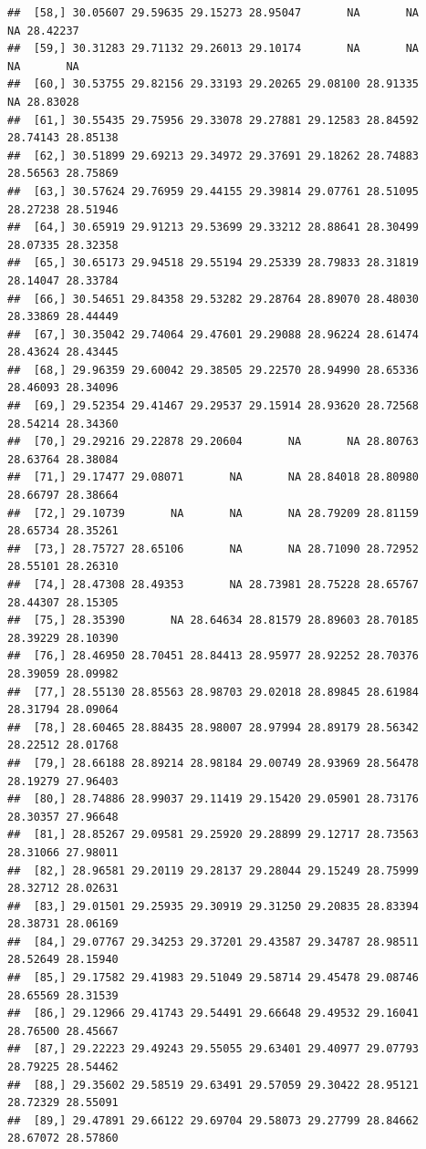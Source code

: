 \documentclass{article}\usepackage[]{graphicx}\usepackage[]{color}
\makeatletter
\newenvironment{kframe}{%
 \def\at@end@of@kframe{}%
 \ifinner\ifhmode%
  \def\at@end@of@kframe{\end{minipage}}%
  \begin{minipage}{\columnwidth}%
 \fi\fi%
 \def\FrameCommand##1{\hskip\@totalleftmargin \hskip-\fboxsep
 \colorbox{shadecolor}{##1}\hskip-\fboxsep
     \hskip-\linewidth \hskip-\@totalleftmargin \hskip\columnwidth}%
 \MakeFramed {\advance\hsize-\width
   \@totalleftmargin\z@ \linewidth\hsize
   \@setminipage}}%
 {\par\unskip\endMakeFramed%
 \at@end@of@kframe}
\newenvironment{knitrout}{}{} %
\makeatother
\begin{document}
\begin{knitrout}
\begin{kframe}
\begin{verbatim}
##  [58,] 30.05607 29.59635 29.15273 28.95047       NA       NA       NA 28.42237
##  [59,] 30.31283 29.71132 29.26013 29.10174       NA       NA       NA       NA
##  [60,] 30.53755 29.82156 29.33193 29.20265 29.08100 28.91335       NA 28.83028
##  [61,] 30.55435 29.75956 29.33078 29.27881 29.12583 28.84592 28.74143 28.85138
##  [62,] 30.51899 29.69213 29.34972 29.37691 29.18262 28.74883 28.56563 28.75869
##  [63,] 30.57624 29.76959 29.44155 29.39814 29.07761 28.51095 28.27238 28.51946
##  [64,] 30.65919 29.91213 29.53699 29.33212 28.88641 28.30499 28.07335 28.32358
##  [65,] 30.65173 29.94518 29.55194 29.25339 28.79833 28.31819 28.14047 28.33784
##  [66,] 30.54651 29.84358 29.53282 29.28764 28.89070 28.48030 28.33869 28.44449
##  [67,] 30.35042 29.74064 29.47601 29.29088 28.96224 28.61474 28.43624 28.43445
##  [68,] 29.96359 29.60042 29.38505 29.22570 28.94990 28.65336 28.46093 28.34096
##  [69,] 29.52354 29.41467 29.29537 29.15914 28.93620 28.72568 28.54214 28.34360
##  [70,] 29.29216 29.22878 29.20604       NA       NA 28.80763 28.63764 28.38084
##  [71,] 29.17477 29.08071       NA       NA 28.84018 28.80980 28.66797 28.38664
##  [72,] 29.10739       NA       NA       NA 28.79209 28.81159 28.65734 28.35261
##  [73,] 28.75727 28.65106       NA       NA 28.71090 28.72952 28.55101 28.26310
##  [74,] 28.47308 28.49353       NA 28.73981 28.75228 28.65767 28.44307 28.15305
##  [75,] 28.35390       NA 28.64634 28.81579 28.89603 28.70185 28.39229 28.10390
##  [76,] 28.46950 28.70451 28.84413 28.95977 28.92252 28.70376 28.39059 28.09982
##  [77,] 28.55130 28.85563 28.98703 29.02018 28.89845 28.61984 28.31794 28.09064
##  [78,] 28.60465 28.88435 28.98007 28.97994 28.89179 28.56342 28.22512 28.01768
##  [79,] 28.66188 28.89214 28.98184 29.00749 28.93969 28.56478 28.19279 27.96403
##  [80,] 28.74886 28.99037 29.11419 29.15420 29.05901 28.73176 28.30357 27.96648
##  [81,] 28.85267 29.09581 29.25920 29.28899 29.12717 28.73563 28.31066 27.98011
##  [82,] 28.96581 29.20119 29.28137 29.28044 29.15249 28.75999 28.32712 28.02631
##  [83,] 29.01501 29.25935 29.30919 29.31250 29.20835 28.83394 28.38731 28.06169
##  [84,] 29.07767 29.34253 29.37201 29.43587 29.34787 28.98511 28.52649 28.15940
##  [85,] 29.17582 29.41983 29.51049 29.58714 29.45478 29.08746 28.65569 28.31539
##  [86,] 29.12966 29.41743 29.54491 29.66648 29.49532 29.16041 28.76500 28.45667
##  [87,] 29.22223 29.49243 29.55055 29.63401 29.40977 29.07793 28.79225 28.54462
##  [88,] 29.35602 29.58519 29.63491 29.57059 29.30422 28.95121 28.72329 28.55091
##  [89,] 29.47891 29.66122 29.69704 29.58073 29.27799 28.84662 28.67072 28.57860

\end{verbatim}
\end{kframe}
\end{knitrout}
\end{document}
